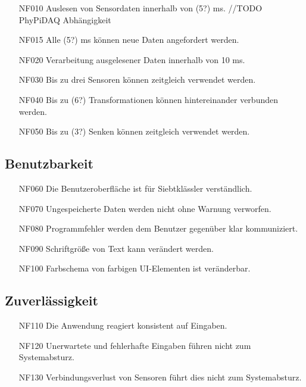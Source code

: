 \documentclass[parskip=full]{scrartcl}
\begin{document}
\begin{itemize}

\item[NF010] Auslesen von Sensordaten innerhalb von (5?) ms. //TODO PhyPiDAQ Abhängigkeit
\item[NF015] Alle (5?) ms können neue Daten angefordert werden.
\item[NF020] Verarbeitung ausgelesener Daten innerhalb von 10 ms.
\item[NF030] Bis zu drei Sensoren können zeitgleich verwendet werden.
\item[NF040] Bis zu (6?) Transformationen können hintereinander verbunden werden.
\item[NF050] Bis zu (3?) Senken können zeitgleich verwendet werden.

\end{itemize}

\subsection{Benutzbarkeit}

\begin{itemize}

\item[NF060] Die Benutzeroberfläche ist für Siebtklässler verständlich.
\item[NF070] Ungespeicherte Daten werden nicht ohne Warnung verworfen.
\item[NF080] Programmfehler werden dem Benutzer gegenüber klar kommuniziert.
\item[NF090] Schriftgröße von Text kann verändert werden.
\item[NF100] Farbschema von farbigen UI-Elementen ist veränderbar.

\end{itemize}

\subsection{Zuverlässigkeit}

\begin{itemize}

\item[NF110] Die Anwendung reagiert konsistent auf Eingaben.
\item[NF120] Unerwartete und fehlerhafte Eingaben führen nicht zum Systemabsturz.
\item[NF130] Verbindungsverlust von Sensoren führt dies nicht zum Systemabsturz.

\end{itemize}
\end{document}
